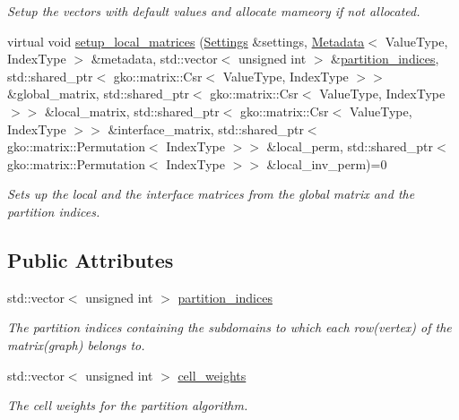 \begin{DoxyCompactItemize}
\begin{DoxyCompactList}\small\item\em Setup the vectors with default values and allocate mameory if not allocated. \end{DoxyCompactList}\item 
virtual void \hyperlink{classSchwarzWrappers_1_1Initialize_a67029ec6f266735f579b219402bf317a}{setup\+\_\+local\+\_\+matrices} (\hyperlink{structSchwarzWrappers_1_1Settings}{Settings} \&settings, \hyperlink{structSchwarzWrappers_1_1Metadata}{Metadata}$<$ Value\+Type, Index\+Type $>$ \&metadata, std\+::vector$<$ unsigned int $>$ \&\hyperlink{classSchwarzWrappers_1_1Initialize_a9ad20884882db7c28560d9f9755e571e}{partition\+\_\+indices}, std\+::shared\+\_\+ptr$<$ gko\+::matrix\+::\+Csr$<$ Value\+Type, Index\+Type $>$$>$ \&global\+\_\+matrix, std\+::shared\+\_\+ptr$<$ gko\+::matrix\+::\+Csr$<$ Value\+Type, Index\+Type $>$$>$ \&local\+\_\+matrix, std\+::shared\+\_\+ptr$<$ gko\+::matrix\+::\+Csr$<$ Value\+Type, Index\+Type $>$$>$ \&interface\+\_\+matrix, std\+::shared\+\_\+ptr$<$ gko\+::matrix\+::\+Permutation$<$ Index\+Type $>$$>$ \&local\+\_\+perm, std\+::shared\+\_\+ptr$<$ gko\+::matrix\+::\+Permutation$<$ Index\+Type $>$$>$ \&local\+\_\+inv\+\_\+perm)=0
\begin{DoxyCompactList}\small\item\em Sets up the local and the interface matrices from the global matrix and the partition indices. \end{DoxyCompactList}\end{DoxyCompactItemize}
\subsection*{Public Attributes}
\begin{DoxyCompactItemize}
\item 
\mbox{\label{classSchwarzWrappers_1_1Initialize_a9ad20884882db7c28560d9f9755e571e}} 
std\+::vector$<$ unsigned int $>$ \hyperlink{classSchwarzWrappers_1_1Initialize_a9ad20884882db7c28560d9f9755e571e}{partition\+\_\+indices}
\begin{DoxyCompactList}\small\item\em The partition indices containing the subdomains to which each row(vertex) of the matrix(graph) belongs to. \end{DoxyCompactList}\item 
\mbox{\label{classSchwarzWrappers_1_1Initialize_af9eb6a60078289291b538db8814572f6}} 
std\+::vector$<$ unsigned int $>$ \hyperlink{classSchwarzWrappers_1_1Initialize_af9eb6a60078289291b538db8814572f6}{cell\+\_\+weights}
\begin{DoxyCompactList}\small\item\em The cell weights for the partition algorithm. \end{DoxyCompactList}\end{DoxyCompactItemize}
